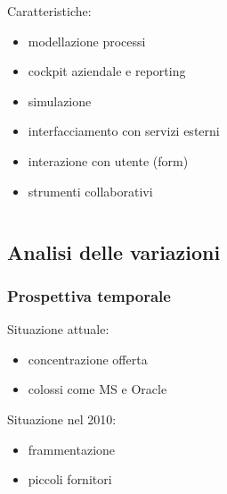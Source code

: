 \documentclass[compress,9pt,handout]{beamer}
\begin{document}
\begin{frame}
\begin{columns}
{\begin{block}{Caratteristiche:}
\begin{itemize}
  \item modellazione processi
  \item cockpit aziendale e reporting
  \item simulazione
  \item interfacciamento con servizi esterni
  \item interazione con utente (form)
  \item strumenti collaborativi
\end{itemize}
\end{block}
}
\end{columns}
\end{frame}

\subsection{Analisi delle variazioni}
\begin{frame}%
\frametitle{Prospettiva temporale}
\hfill\begin{minipage}[b]{.4\textwidth}
\begin{block}{Situazione attuale:}
\begin{itemize}
  \item concentrazione offerta
  \item colossi come MS e Oracle
\end{itemize}
\end{block}
\end{minipage}


\begin{minipage}[b]{.4\textwidth}
\begin{block}{Situazione nel 2010:}
\begin{itemize}
  \item frammentazione
  \item piccoli fornitori
\end{itemize}
\end{block}
\end{minipage}
\end{frame}
\end{document}

